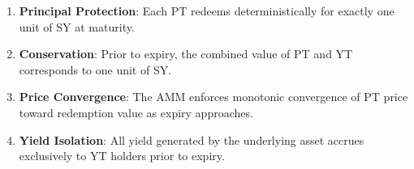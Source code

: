 \begin{enumerate}
    \item \textbf{Principal Protection}: Each PT redeems deterministically for exactly one unit of SY at maturity.
    \item \textbf{Conservation}: Prior to expiry, the combined value of PT and YT corresponds to one unit of SY.
    \item \textbf{Price Convergence}: The AMM enforces monotonic convergence of PT price toward redemption value as expiry approaches.
    \item \textbf{Yield Isolation}: All yield generated by the underlying asset accrues exclusively to YT holders prior to expiry.
\end{enumerate}
